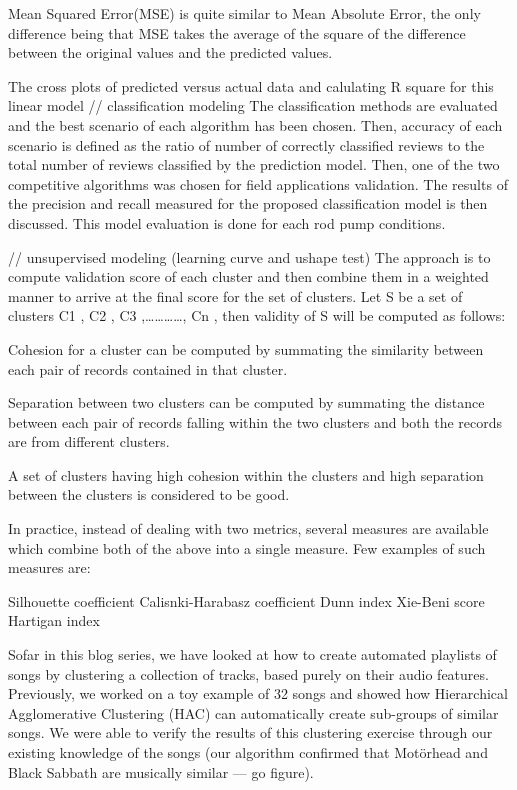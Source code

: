 Mean Squared Error(MSE) is quite similar to Mean Absolute Error, the only difference being that MSE takes the average of the square of the difference between the original values and the predicted values.

The cross plots of predicted versus actual data and calulating R square for this linear model
// classification modeling
The classification methods are evaluated and the best scenario of each algorithm has been chosen. Then, accuracy of each scenario is defined as the ratio of number of correctly classified reviews to the total number of reviews classified by the prediction model. Then, one of the two competitive algorithms was chosen for field applications validation. The results of the precision and recall measured for the proposed classification model is then discussed. This model evaluation is done for each rod pump conditions.

// unsupervised modeling (learning curve and ushape test)
The approach is to compute validation score of each cluster and then combine them in a weighted manner to arrive at the final score for the set of clusters. Let S be a set of clusters {C1 , C2 , C3 ,…………, Cn }, then validity of S will be computed as follows:

Cohesion for a cluster can be computed by summating the similarity between each pair of records contained in that cluster.

Separation between two clusters can be computed by summating the distance between each pair of records falling within the two clusters and both the records are from different clusters.

A set of clusters having high cohesion within the clusters and high separation between the clusters is considered to be good.

In practice, instead of dealing with two metrics, several measures are available which combine both of the above into a single measure. Few examples of such measures are:

Silhouette coefficient
Calisnki-Harabasz coefficient
Dunn index
Xie-Beni score
Hartigan index

Sofar in this blog series, we have looked at how to create automated playlists of songs by clustering a collection of tracks, based purely on their audio features. Previously, we worked on a toy example of 32 songs and showed how Hierarchical Agglomerative Clustering (HAC) can automatically create sub-groups of similar songs. We were able to verify the results of this clustering exercise through our existing knowledge of the songs (our algorithm confirmed that Motörhead and Black Sabbath are musically similar — go figure).

